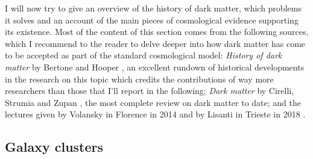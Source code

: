 I will now try to give an overview of the history of dark matter, which problems it solves and an account of the main pieces of cosmological evidence supporting its existence. Most of the content of this section comes from the following sources, which I recommend to the reader to delve deeper into how dark matter has come to be accepted as part of the standard cosmological model: \emph{History of dark matter} by Bertone and Hooper \cite{Bertone_2018}, an excellent rundown of historical developments in the research on this topic which credits the contributions of way more researchers than those that I'll report in the following; \emph{Dark matter} by Cirelli, Strumia and Zupan \cite{Cirelli_2024}, the most complete review on dark matter to date; and the lectures given by Volansky in Florence in 2014 \cite{Volansky_2014} and by Lisanti in Trieste in 2018 \cite{Lisanti_2018}.

\subsection{Galaxy clusters}

